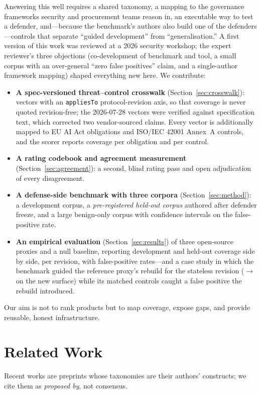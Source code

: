 \documentclass[conference]{IEEEtran}
\newcommand{\rev}{2026-07-28}
\begin{document}
Answering this well requires a shared taxonomy, a mapping to the governance frameworks security and procurement teams reason in, an executable way to test a defender, and---because the benchmark's authors also build one of the defenders---controls that separate ``guided development'' from ``generalisation.'' A first version of this work was reviewed at a 2026 security workshop; the expert reviewer's three objections (co-development of benchmark and tool, a small corpus with an over-general ``zero false positives'' claim, and a single-author framework mapping) shaped everything new here. We contribute:
\begin{itemize}
\item \textbf{A spec-versioned threat--control crosswalk} (Section~\ref{sec:crosswalk}): \nVectors{} vectors with an \texttt{appliesTo} protocol-revision axis, so that coverage is never quoted revision-free; the \nNew{} \rev{} vectors were verified against specification text, which corrected two vendor-sourced claims. Every vector is additionally mapped to EU AI Act obligations and ISO/IEC 42001 Annex~A controls, and the scorer reports coverage per obligation and per control.
\item \textbf{A rating codebook and agreement measurement} (Section~\ref{sec:agreement}): a second, blind rating pass and open adjudication of every disagreement.
\item \textbf{A defense-side benchmark with three corpora} (Section~\ref{sec:method}): a development corpus, a \emph{pre-registered held-out corpus} authored after defender freeze, and a large benign-only corpus with confidence intervals on the false-positive rate.
\item \textbf{An empirical evaluation} (Section~\ref{sec:results}) of three open-source proxies and a null baseline, reporting development and held-out coverage side by side, per revision, with false-positive rates---and a case study in which the benchmark guided the reference proxy's rebuild for the stateless revision (\bastNewPrev{}$\rightarrow$\bastNew{} on the new surface) while its matched controls caught a false positive the rebuild introduced.
\end{itemize}
Our aim is not to rank products but to map coverage, expose gaps, and provide reusable, honest infrastructure.

\section{Related Work}\label{sec:related}
Recent works are preprints whose taxonomies are their authors' constructs; we cite them as \emph{proposed by}, not consensus.
\end{document}
